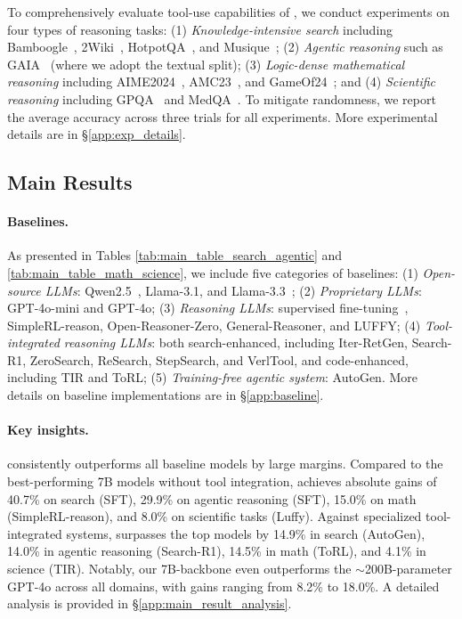 



To comprehensively evaluate tool-use capabilities of \model, we conduct experiments on four types of reasoning tasks: (1) \textit{Knowledge-intensive search} including Bamboogle~\citep{press2023measuring}, 2Wiki~\citep{ho2020constructing}, HotpotQA~\citep{yang2018hotpotqa}, and Musique~\citep{trivedi2022musique}; (2) \textit{Agentic reasoning} such as GAIA~\citep{mialon2023gaia} (where we adopt the textual split); (3) \textit{Logic-dense mathematical reasoning} including AIME2024~\citep{aops_aime}, AMC23~\citep{AMC23}, and GameOf24~\citep{lightman2023let}; and (4) \textit{Scientific reasoning} including GPQA~\citep{rein2024gpqa} and MedQA~\citep{yang2024llm}. To mitigate randomness, we report the average accuracy across three trials for all experiments. More experimental details are in \S\ref{app:exp_details}.

\subsection{Main Results}
\label{subsec:main_results}

\paragraph{Baselines.} As presented in Tables \ref{tab:main_table_search_agentic} and \ref{tab:main_table_math_science}, we include five categories of baselines: 
(1) \textit{Open-source LLMs}: Qwen2.5~\citep{yang2024qwen2.5}, Llama-3.1, and Llama-3.3~\citep{dubey2024llama}; 
(2) \textit{Proprietary LLMs}: GPT-4o-mini and GPT-4o;
(3) \textit{Reasoning LLMs}: supervised fine-tuning~\citep{yang2024qwen2}, SimpleRL-reason, Open-Reasoner-Zero, General-Reasoner, and LUFFY; (4) \textit{Tool-integrated reasoning LLMs}: both search-enhanced, including Iter-RetGen, Search-R1, ZeroSearch, ReSearch, StepSearch, and VerlTool, and code-enhanced, including TIR and ToRL; (5) \textit{Training-free agentic system}: AutoGen. More details on baseline implementations are in \S\ref{app:baseline}.

\paragraph{Key insights.}
\model consistently outperforms all baseline models by large margins. Compared to the best-performing 7B models without tool integration, \model achieves absolute gains of 40.7\% on search (SFT), 29.9\% on agentic reasoning (SFT), 15.0\% on math (SimpleRL-reason), and 8.0\% on scientific tasks (Luffy). Against specialized tool-integrated systems, \model surpasses the top models by 14.9\% in search (AutoGen), 14.0\% in agentic reasoning (Search-R1), 14.5\% in math (ToRL), and 4.1\% in science (TIR). Notably, our 7B-backbone \model even outperforms the $\sim$200B-parameter GPT-4o across all domains, with gains ranging from 8.2\% to 18.0\%. A detailed analysis is provided in \S\ref{app:main_result_analysis}.


